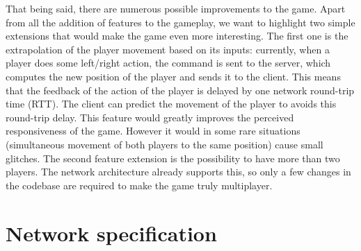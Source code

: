 \documentclass[english, DIV=13]{scrreprt}
\begin{document}
That being said, there are numerous possible improvements to the game. Apart
from all the addition of features to the gameplay, we want to highlight two
simple extensions that would make the game even more interesting. The first one
is the extrapolation of the player movement based on its inputs: currently, when
a player does some left/right action, the command is sent to the server, which
computes the new position of the player and sends it to the client. This means
that the feedback of the action of the player is delayed by one network
round-trip time (RTT). The client can predict the movement of the player to
avoids this round-trip delay. This feature would greatly improves the perceived
responsiveness of the game. However it would in some rare situations
(simultaneous movement of both players to the same position) cause small
glitches. The second feature extension is the possibility to have more than two
players. The network architecture already supports this, so only a few
changes in the codebase are required to make the game truly multiplayer.

\appendix

\chapter{Network specification}
\label{app:protocol}


\end{document}
